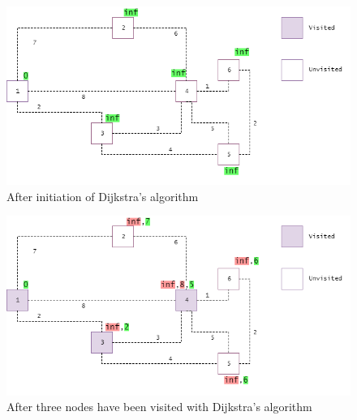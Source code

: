 \documentclass {article}
\begin{document}
\begin{figure}[H]
\includegraphics[width=\textwidth]{dijkstras-algorithm-example1}


\caption{After initiation of Dijkstra's algorithm}
\label{fig:dijkstras-algorithm-example1}
\end{figure}
\begin{figure}[H]
\includegraphics[width=\textwidth]{dijkstras-algorithm-example2}

\caption{After three nodes have been visited with Dijkstra's algorithm}
\label{fig:dijkstras-algorithm-example2}
\end{figure}
\end{document}
